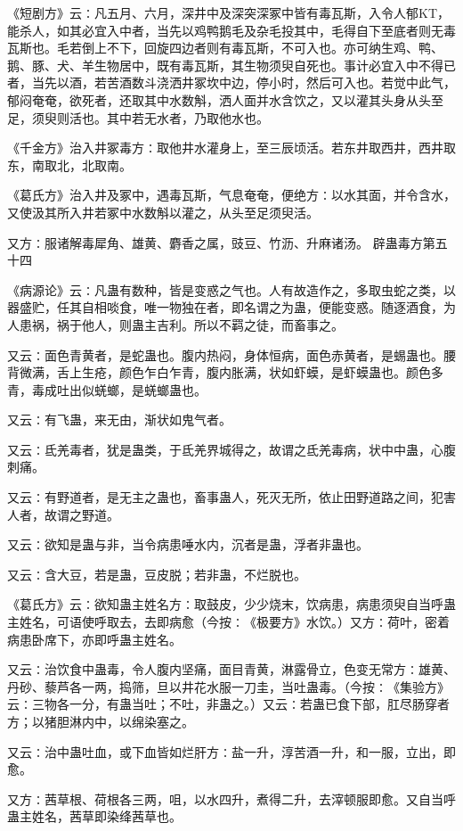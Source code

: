 \documentclass[a4paper,12pt,UTF8,twoside]{ctexbook}
\begin{document}
《短剧方》云∶凡五月、六月，深井中及深突深冢中皆有毒瓦斯，入令人郁KT，能杀人，如其必宜入中者，当先以鸡鸭鹅毛及杂毛投其中，毛得自下至底者则无毒瓦斯也。毛若倒上不下，回旋四边者则有毒瓦斯，不可入也。亦可纳生鸡、鸭、鹅、豚、犬、羊生物居中，既有毒瓦斯，其生物须臾自死也。事计必宜入中不得已者，当先以酒，若苦酒数斗浇洒井冢坎中边，停小时，然后可入也。若觉中此气，郁闷奄奄，欲死者，还取其中水数斛，洒人面并水含饮之，又以灌其头身从头至足，须臾则活也。其中若无水者，乃取他水也。

《千金方》治入井冢毒方∶取他井水灌身上，至三辰顷活。若东井取西井，西井取东，南取北，北取南。

《葛氏方》治入井及冢中，遇毒瓦斯，气息奄奄，便绝方∶以水其面，并令含水，又使汲其所入井若冢中水数斛以灌之，从头至足须臾活。

又方∶服诸解毒犀角、雄黄、麝香之属，豉豆、竹沥、升麻诸汤。
辟蛊毒方第五十四

《病源论》云∶凡蛊有数种，皆是变惑之气也。人有故造作之，多取虫蛇之类，以器盛贮，任其自相啖食，唯一物独在者，即名谓之为蛊，便能变惑。随逐酒食，为人患祸，祸于他人，则蛊主吉利。所以不羁之徒，而畜事之。

又云∶面色青黄者，是蛇蛊也。腹内热闷，身体恒病，面色赤黄者，是蜴蛊也。腰背微满，舌上生疮，颜色乍白乍青，腹内胀满，状如虾蟆，是虾蟆蛊也。颜色多青，毒成吐出似蜣螂，是蜣螂蛊也。

又云∶有飞蛊，来无由，渐状如鬼气者。

又云∶氐羌毒者，犹是蛊类，于氐羌界城得之，故谓之氐羌毒病，状中中蛊，心腹刺痛。

又云∶有野道者，是无主之蛊也，畜事蛊人，死灭无所，依止田野道路之间，犯害人者，故谓之野道。

又云∶欲知是蛊与非，当令病患唾水内，沉者是蛊，浮者非蛊也。

又云∶含大豆，若是蛊，豆皮脱；若非蛊，不烂脱也。

《葛氏方》云∶欲知蛊主姓名方∶取鼓皮，少少烧末，饮病患，病患须臾自当呼蛊主姓名，可语使呼取去，去即病愈（今按∶《极要方》水饮。）又方∶荷叶，密着病患卧席下，亦即呼蛊主姓名。

又云∶治饮食中蛊毒，令人腹内坚痛，面目青黄，淋露骨立，色变无常方∶雄黄、丹砂、藜芦各一两，捣筛，旦以井花水服一刀圭，当吐蛊毒。（今按∶《集验方》云∶三物各一分，有蛊当吐；不吐，非蛊之。）又云∶若蛊已食下部，肛尽肠穿者方；以猪胆淋内中，以绵染塞之。

又云∶治中蛊吐血，或下血皆如烂肝方∶盐一升，淳苦酒一升，和一服，立出，即愈。

又方∶茜草根、荷根各三两，咀，以水四升，煮得二升，去滓顿服即愈。又自当呼蛊主姓名，茜草即染绛茜草也。
\end{document}

